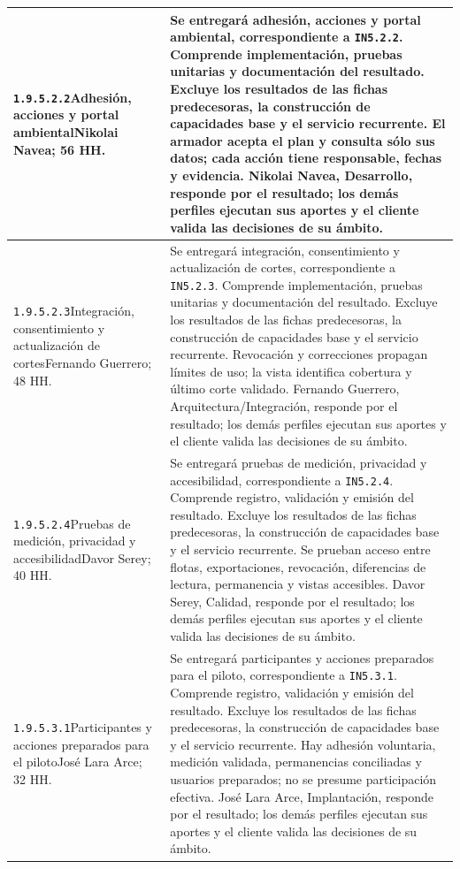\begin{longtable}{L{52mm}L{91mm}}
\texttt{1.\allowbreak{}9.\allowbreak{}5.\allowbreak{}2.\allowbreak{}2}\newline Adhesión, acciones y portal ambiental\newline Nikolai Navea; 56 HH. & Se entregará adhesión, acciones y portal ambiental, correspondiente a \texttt{IN5.2.2}. Comprende implementación, pruebas unitarias y documentación del resultado. Excluye los resultados de las fichas predecesoras, la construcción de capacidades base y el servicio recurrente.  El armador acepta el plan y consulta sólo sus datos; cada acción tiene responsable, fechas y evidencia. Nikolai Navea, Desarrollo, responde por el resultado; los demás perfiles ejecutan sus aportes y el cliente valida las decisiones de su ámbito.\\\hline
\texttt{1.\allowbreak{}9.\allowbreak{}5.\allowbreak{}2.\allowbreak{}3}\newline Integración, consentimiento y actualización de cortes\newline Fernando Guerrero; 48 HH. & Se entregará integración, consentimiento y actualización de cortes, correspondiente a \texttt{IN5.2.3}. Comprende implementación, pruebas unitarias y documentación del resultado. Excluye los resultados de las fichas predecesoras, la construcción de capacidades base y el servicio recurrente.  Revocación y correcciones propagan límites de uso; la vista identifica cobertura y último corte validado. Fernando Guerrero, Arquitectura/Integración, responde por el resultado; los demás perfiles ejecutan sus aportes y el cliente valida las decisiones de su ámbito.\\\hline
\texttt{1.\allowbreak{}9.\allowbreak{}5.\allowbreak{}2.\allowbreak{}4}\newline Pruebas de medición, privacidad y accesibilidad\newline Davor Serey; 40 HH. & Se entregará pruebas de medición, privacidad y accesibilidad, correspondiente a \texttt{IN5.2.4}. Comprende registro, validación y emisión del resultado. Excluye los resultados de las fichas predecesoras, la construcción de capacidades base y el servicio recurrente.  Se prueban acceso entre flotas, exportaciones, revocación, diferencias de lectura, permanencia y vistas accesibles. Davor Serey, Calidad, responde por el resultado; los demás perfiles ejecutan sus aportes y el cliente valida las decisiones de su ámbito.\\\hline
\texttt{1.\allowbreak{}9.\allowbreak{}5.\allowbreak{}3.\allowbreak{}1}\newline Participantes y acciones preparados para el piloto\newline José Lara Arce; 32 HH. & Se entregará participantes y acciones preparados para el piloto, correspondiente a \texttt{IN5.3.1}. Comprende registro, validación y emisión del resultado. Excluye los resultados de las fichas predecesoras, la construcción de capacidades base y el servicio recurrente.  Hay adhesión voluntaria, medición validada, permanencias conciliadas y usuarios preparados; no se presume participación efectiva. José Lara Arce, Implantación, responde por el resultado; los demás perfiles ejecutan sus aportes y el cliente valida las decisiones de su ámbito.\\\hline

\end{longtable}
